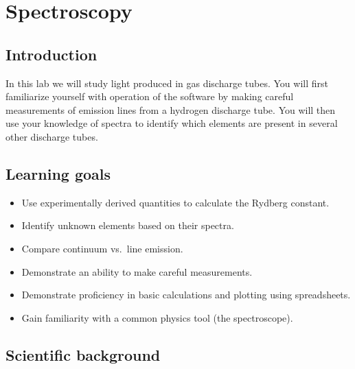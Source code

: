 \chapter{Spectroscopy}

%

\section{Introduction}

In this lab we will study light produced in gas discharge tubes.
You will first familiarize yourself with operation of the software by making careful measurements of emission lines from a hydrogen discharge tube.
You will then use your knowledge of spectra to identify which elements are present in several other discharge tubes.

\section{Learning goals}

\begin{itemize}
	\item Use experimentally derived quantities to calculate the Rydberg constant.
	\item Identify unknown elements based on their spectra.
	\item Compare continuum vs.\ line emission.
	\item Demonstrate an ability to make careful measurements.
	\item Demonstrate proficiency in basic calculations and plotting using spreadsheets.
	\item Gain familiarity with a common physics tool (the spectroscope).
\end{itemize}

\section{Scientific background}

